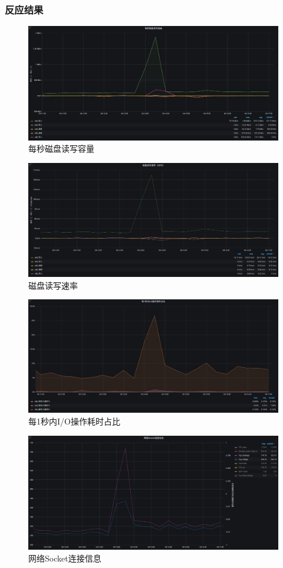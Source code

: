 \documentclass[hyperref,a4paper,UTF8]{ctexart}
\begin{document}
\subsubsection{反应结果}
\begin{figure}[H]
    \centering
    \includegraphics[width=0.75\linewidth]{故障注入/4.png}
    \caption{每秒磁盘读写容量}
    \label{fig:enter-label}
\end{figure}
\begin{figure}[H]
    \centering
    \includegraphics[width=0.75\linewidth]{故障注入/5.png}
    \caption{磁盘读写速率}
    \label{fig:enter-label}
\end{figure}
\begin{figure}[H]
    \centering
    \includegraphics[width=0.75\linewidth]{故障注入/6.png}
    \caption{每1秒内I/O操作耗时占比}
    \label{fig:enter-label}
\end{figure}
\begin{figure}[H]
    \centering
    \includegraphics[width=0.75\linewidth]{故障注入/7.png}
    \caption{网络Socket连接信息}
    \label{fig:enter-label}
\end{figure}
\end{document}
